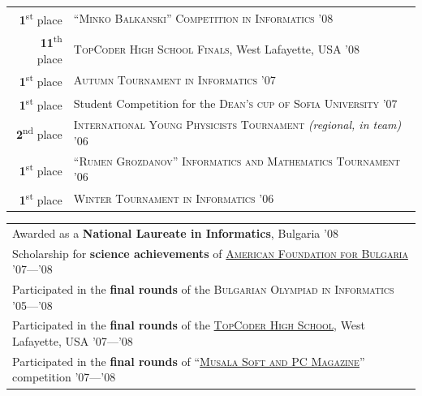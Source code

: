 \documentclass[a4paper,10pt]{article}
\def\myline{\color{linegray}\vline}
\newcommand{\minorcolor}[1]{\textcolor{mygray}{#1}}
\newcommand{\bracketcomment}[1]{{\small\textit{\minorcolor{(#1)}}}}
\begin{document}
{\vspace{-3mm}\hspace{3.5mm}\begin{tabular}{r!{\myline}p{14cm}}
        \textbf{1}\textsuperscript{st} place    &  \textsc{``Minko Balkanski''} \textsc{Competition in Informatics} \textsc{'08}\\
        \textbf{11}\textsuperscript{th} place   &  \textsc{TopCoder High School Finals}, West Lafayette, USA \textsc{'08}\\
  \textbf{1}\textsuperscript{st} place    &  \textsc{Autumn Tournament in Informatics} \textsc{'07}\\
  \textbf{1}\textsuperscript{st} place    &  Student Competition for the \textsc{Dean's cup of Sofia University} \textsc{'07}\\
  \textbf{2}\textsuperscript{nd} place   &  \textsc{International Young Physicists Tournament} \bracketcomment{regional, in team} \textsc{'06}\\
  \textbf{1}\textsuperscript{st} place    &  \textsc{``Rumen Grozdanov''} \textsc{Informatics and Mathematics Tournament} \textsc{'06}\\
  \textbf{1}\textsuperscript{st} place    &  \textsc{Winter Tournament in Informatics} \textsc{'06}\\
\end{tabular}
\medskip

\hspace{3mm}\begin{tabular}{@{•\enskip}p{14.5cm}}
	Awarded as a \textbf{National Laureate in Informatics}, Bulgaria \textsc{'08}\\
        Scholarship for \textbf{science achievements} of \href{http://www.afbulgaria.org/}{\textsc{American Foundation for Bulgaria}} \textsc{'07}---\textsc{'08}\\
	Participated in the \textbf{final rounds} of the \textsc{Bulgarian Olympiad in Informatics} \textsc{'05}---\textsc{'08}\\
        Participated in the \textbf{final rounds} of the \href{http://community.topcoder.com/tc?module=Static&d1=tournaments&d2=home}{\textsc{TopCoder High School}}, West Lafayette, USA \textsc{'07}---\textsc{'08}\\
        Participated in the \textbf{final rounds} of ``\href{http://konkurs.musala.com/}{\textsc{Musala Soft and PC Magazine}}'' competition \textsc{'07}---\textsc{'08}\\
\end{tabular}

}
\end{document}
